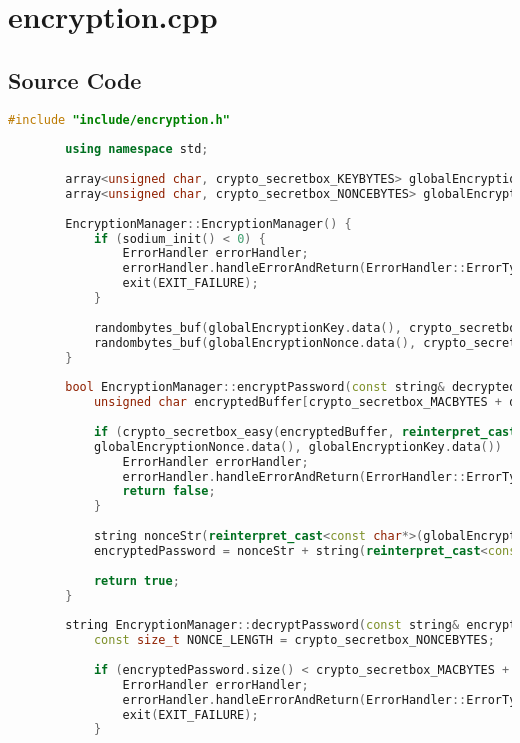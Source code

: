 \documentclass{article}
\begin{document}
	\section{encryption.cpp}
	
	\subsection*{Source Code}
	\begin{lstlisting}[language=C++]
		#include "include/encryption.h"
		
		using namespace std;
		
		array<unsigned char, crypto_secretbox_KEYBYTES> globalEncryptionKey;
		array<unsigned char, crypto_secretbox_NONCEBYTES> globalEncryptionNonce;
		
		EncryptionManager::EncryptionManager() {
			if (sodium_init() < 0) {
				ErrorHandler errorHandler;
				errorHandler.handleErrorAndReturn(ErrorHandler::ErrorType::LIBSODIUM_INIT_ERROR);
				exit(EXIT_FAILURE);
			}
			
			randombytes_buf(globalEncryptionKey.data(), crypto_secretbox_KEYBYTES);
			randombytes_buf(globalEncryptionNonce.data(), crypto_secretbox_NONCEBYTES);
		}
		
		bool EncryptionManager::encryptPassword(const string& decryptedPassword, string& encryptedPassword) {
			unsigned char encryptedBuffer[crypto_secretbox_MACBYTES + decryptedPassword.size()];
			
			if (crypto_secretbox_easy(encryptedBuffer, reinterpret_cast<const unsigned char*>(decryptedPassword.c_str()), decryptedPassword.size(),
			globalEncryptionNonce.data(), globalEncryptionKey.data()) != 0) {
				ErrorHandler errorHandler;
				errorHandler.handleErrorAndReturn(ErrorHandler::ErrorType::EMAIL_PASSWORD_ENCRYPTION_ERROR);
				return false;
			}
			
			string nonceStr(reinterpret_cast<const char*>(globalEncryptionNonce.data()), globalEncryptionNonce.size());
			encryptedPassword = nonceStr + string(reinterpret_cast<const char*>(encryptedBuffer), sizeof(encryptedBuffer));
			
			return true;
		}
		
		string EncryptionManager::decryptPassword(const string& encryptedPassword) {
			const size_t NONCE_LENGTH = crypto_secretbox_NONCEBYTES;
			
			if (encryptedPassword.size() < crypto_secretbox_MACBYTES + NONCE_LENGTH) {
				ErrorHandler errorHandler;
				errorHandler.handleErrorAndReturn(ErrorHandler::ErrorType::EMAIL_PASSWORD_ENCRYPTION_FORMAT_ERROR);
				exit(EXIT_FAILURE);
			}
			

\end{lstlisting}
\end{document}

